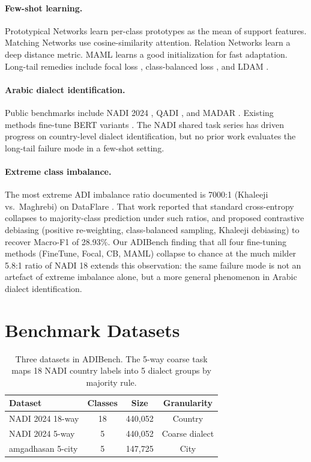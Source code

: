 \documentclass[11pt,a4paper,twocolumn]{article}
\newcommand{\bench}{ADIBench}
\begin{document}
\paragraph{Few-shot learning.}
Prototypical Networks \citep{Snell2017} learn per-class prototypes
as the mean of support features. Matching Networks
\citep{Vinyals2016} use cosine-similarity attention. Relation
Networks \citep{Sung2018} learn a deep distance metric. MAML
\citep{Finn2017} learns a good initialization for fast adaptation.
Long-tail remedies include focal loss \citep{Lin2017}, class-balanced
loss \citep{Cui2019}, and LDAM \citep{Cao2019ldam}.

\paragraph{Arabic dialect identification.}
Public benchmarks include NADI 2024 \citep{Al-Badrashiny2024},
QADI \citep{Abdelrahman-Rezk2020QADI}, and MADAR \citep{Bouamor2019}.
Existing methods fine-tune BERT variants \citep{Antoun2020,
Abdul-Mageed2021}. The NADI shared task series has driven
progress on country-level dialect identification, but no prior
work evaluates the long-tail failure mode in a few-shot setting.

\paragraph{Extreme class imbalance.}
The most extreme ADI imbalance ratio documented is 7000:1
(Khaleeji vs.\ Maghrebi) on DataFlare
\citeyearpar{DACD2024}. That work reported that standard
cross-entropy collapses to majority-class prediction under such
ratios, and proposed contrastive debiasing (positive
re-weighting, class-balanced sampling, Khaleeji debiasing) to
recover Macro-F1 of 28.93\%. Our \bench{} finding that all
four fine-tuning methods (FineTune, Focal, CB, MAML) collapse to
chance at the much milder 5.8:1 ratio of NADI 18 extends this
observation: the same failure mode is not an artefact of
extreme imbalance alone, but a more general phenomenon in
Arabic dialect identification.

\section{Benchmark Datasets}
\label{sec:datasets}

\begin{table}[t]
\centering\small
\begin{tabular}{lccc}
\toprule
Dataset & Classes & Size & Granularity \\
\midrule
NADI 2024 18-way & 18 & 440,052 & Country \\
NADI 2024 5-way & 5 & 440,052 & Coarse dialect \\
amgadhasan 5-city & 5 & 147,725 & City \\
\bottomrule
\end{tabular}
\caption{Three datasets in \bench{}. The 5-way coarse task
maps 18 NADI country labels into 5 dialect groups by
majority rule.}
\label{tab:datasets}
\end{table}
\end{document}
